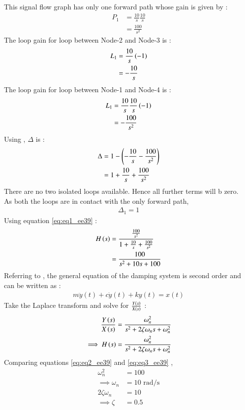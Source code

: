 \documentclass[journal,12pt,twocolumn]{IEEEtran}
\theoremstyle{remark}
\begin{document}


This signal flow graph has only one forward path whose gain is given by :
\begin{align}
    P_1 &= \frac{10}{s} \frac{10}{s}\\
    &= \frac{100}{s^2}
\end{align}
The loop gain for loop between Node-2 and Node-3 is :
\begin{align}
    L_1 &= \frac{10}{s}\left(-1\right)\\
    &= -\frac{10}{s}
\end{align}
The loop gain for loop between Node-1 and Node-4 is :
\begin{align}
    L_1 &= \frac{10}{s}\frac{10}{s}\left(-1\right)\\
    &= -\frac{100}{s^2}
\end{align}
Using , $\Delta$ is :
\begin{align}
    \Delta &= 1 - \left(-\frac{10}{s} - \frac{100}{s^2}\right)\\
    &= 1 + \frac{10}{s} + \frac{100}{s^2}
\end{align}
There are no two isolated loops available. Hence all further terms will b zero.\\
As both the loops are in contact with the only forward path,
\begin{align}
    \Delta_1 = 1
\end{align}
Using equation \eqref{eq:eq1_ee39} :
\begin{align}
    H\left(s\right) &= \frac{\frac{100}{s^2}}{1 + \frac{10}{s} + \frac{100}{s^2}} \\
    &= \frac{100}{s^2 + 10s + 100}\label{eq:eq2_ee39}
\end{align}
Referring to , the general equation of the damping system is second order and can be written as :
\begin{align}
    m\ddot{y}(t) + c\dot{y}(t) + ky(t) = x(t)
\end{align}
Take the Laplace transform and solve for $\frac{Y\left(s\right)}{X\left(s\right)}$ :
\begin{align}
    \frac{Y\left(s\right)}{X\left(s\right)} &= \frac{\omega_n^2}{s^2 + 2\zeta\omega_n s + \omega_n^2}\\
\implies H\left(s\right) &= \frac{\omega_n^2}{s^2 + 2\zeta\omega_n s + \omega_n^2} \label{eq:eq3_ee39}
\end{align}
Comparing equations \eqref{eq:eq2_ee39} and \eqref{eq:eq3_ee39} ,
\begin{align}
    \omega_n ^2 &= 100\\
    \implies \omega_n &= 10 \text{ rad/s} \label{eq:eq4_ee39}\\
    2\zeta \omega_n &= 10\\
    \implies \zeta &= 0.5
\end{align}
\end{document}
